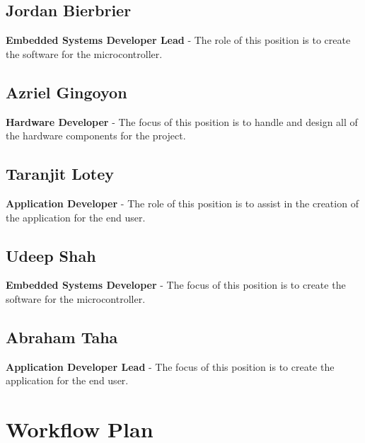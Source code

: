 \documentclass{article}
\begin{document}
\subsection*{Jordan Bierbrier}
\textbf{Embedded Systems Developer Lead} - The role of this position is to create the software for the microcontroller.

\subsection*{Azriel Gingoyon}
\textbf{Hardware Developer} - The focus of this position is to handle and design all of the hardware components for the project.

\subsection*{Taranjit Lotey}
\textbf{Application Developer} - The role of this position is to assist in the creation of the application for the end user.
                                
\subsection*{Udeep Shah}
\textbf{Embedded Systems Developer} - The focus of this position is to create the software for the microcontroller.

\subsection*{Abraham Taha}
\textbf{Application Developer Lead} - The focus of this position is to create the application for the end user.


\section{Workflow Plan}
\end{document}
